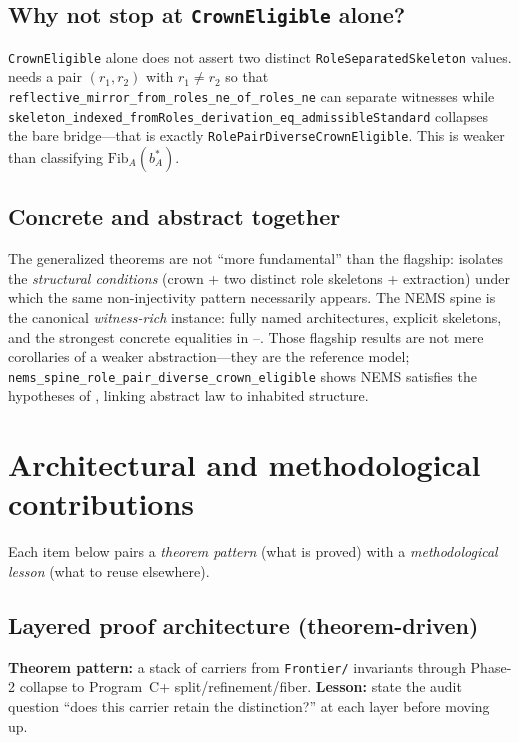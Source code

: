 \documentclass[11pt]{article}
\begin{document}
\subsection{Why not stop at \texttt{CrownEligible} alone?}\label{sec:flagship-why-not-crown}
\texttt{CrownEligible} alone does not assert two distinct \texttt{RoleSeparatedSkeleton} values.  needs a pair $(r_1,r_2)$ with $r_1 \neq r_2$ so that \texttt{reflective\_mirror\_from\_roles\_ne\_of\_roles\_ne} can separate witnesses while \texttt{skeleton\_indexed\_fromRoles\_derivation\_eq\_admissibleStandard} collapses the bare bridge---that is exactly \texttt{RolePairDiverseCrownEligible}. This is weaker than classifying $\mathrm{Fib}_A(b^\ast_A)$.

\subsection{Concrete and abstract together}\label{sec:flagship-concrete-abstract}
The generalized theorems are not ``more fundamental'' than the flagship:  isolates the \emph{structural conditions} (crown + two distinct role skeletons + extraction) under which the same non-injectivity pattern necessarily appears. The NEMS spine is the canonical \emph{witness-rich} instance: fully named architectures, explicit skeletons, and the strongest concrete equalities in --. Those flagship results are not mere corollaries of a weaker abstraction---they are the reference model; \texttt{nems\_spine\_role\_pair\_diverse\_crown\_eligible} shows NEMS satisfies the hypotheses of , linking abstract law to inhabited structure.

\section{Architectural and methodological contributions}\label{sec:contributions}

Each item below pairs a \emph{theorem pattern} (what is proved) with a \emph{methodological lesson} (what to reuse elsewhere).

\subsection{Layered proof architecture (theorem-driven)}\label{sec:contributions-proof}
\textbf{Theorem pattern:} a stack of carriers from \texttt{Frontier/} invariants through Phase-2 collapse  to Program~C+ split/refinement/fiber. \textbf{Lesson:} state the audit question ``does this carrier retain the distinction?'' at each layer before moving up.
\end{document}
